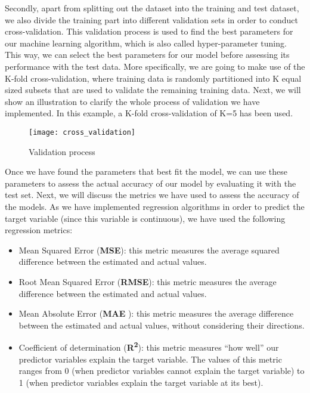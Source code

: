 Secondly, apart from splitting out the dataset into the training and test dataset, we also divide the training part into different validation sets in order to conduct cross-validation. This validation process is used to find the best parameters for our machine learning algorithm, which is also called hyper-parameter tuning. This way, we can select the best parameters for our model before assessing its performance with the test data. More specifically, we are going to make use of the K-fold cross-validation, where training data is randomly partitioned into K equal sized subsets that are used to validate the remaining training data. Next, we will show an illustration to clarify the whole process of validation we have implemented. In this example, a K-fold cross-validation of K=5 has been used.\\

\begin{figure}[H]
	\centering
	\texttt{[image: cross\_validation]}
	\caption{Validation process}
\end{figure}

Once we have found the parameters that best fit the model, we can use these parameters to assess the actual accuracy of our model by evaluating it with the test set. Next, we will discuss the metrics we have used to assess the accuracy of the models. As we have implemented regression algorithms in order to predict the target variable (since this variable is continuous), we have used the following regression metrics:

\begin{itemize}

	\item Mean Squared Error (\textbf{MSE}): this metric measures the average squared difference between the estimated and actual values.
	
	\item Root Mean Squared Error (\textbf{RMSE}): this metric measures the average difference between the estimated and actual values.
	
	\item Mean Absolute Error (\textbf{MAE} ): this metric measures the average difference between the estimated and actual values, without considering their directions.
	
	\item Coefficient of determination (\textbf{R\textsuperscript{2}}): this metric measures “how well” our predictor variables explain the target variable. The values of this metric ranges from 0 (when predictor variables cannot explain the target variable) to 1 (when predictor variables explain the target variable at its best).

\end{itemize}

